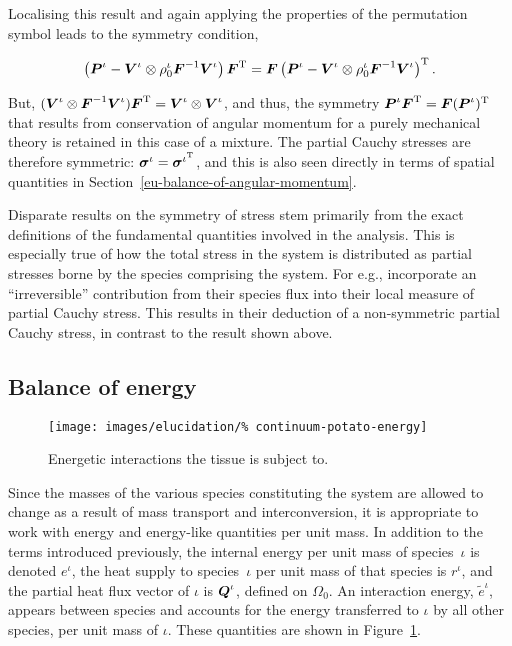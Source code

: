 \noindent Localising this result and again applying the properties of
the permutation symbol leads to the symmetry condition,

\begin{equation}
\left(\mbox{\boldmath$ P$}^\iota-\mbox{\boldmath$ V$}^\iota\otimes\rho^\iota_0\mbox{\boldmath$ F$}^{-1}\mbox{\boldmath$ V$}^\iota\right)
\mbox{\boldmath$ F$}^\mathrm{T} = \mbox{\boldmath$ F$}\left(\mbox{\boldmath$ P$}^\iota-\mbox{\boldmath$ V$}^\iota \otimes
\rho^\iota_0\mbox{\boldmath$ F$}^{-1}\mbox{\boldmath$ V$}^\iota\right)^\mathrm{T}.
\label{localbalanceofangularmomentum}
\end{equation}

\noindent But, $(\mbox{\boldmath$ V$}^\iota\otimes\mbox{\boldmath$ F$}^{-1}\mbox{\boldmath$ V$}^\iota)\mbox{\boldmath$ F$}^\mathrm{T} =
\mbox{\boldmath$ V$}^\iota\otimes\mbox{\boldmath$ V$}^\iota$, and thus, the symmetry
$\mbox{\boldmath$ P$}^\iota\mbox{\boldmath$ F$}^\mathrm{T} = \mbox{\boldmath$ F$}(\mbox{\boldmath$ P$}^\iota)^\mathrm{T}$ that results
from conservation of angular momentum for a purely mechanical theory
is retained in this case of a mixture. The partial Cauchy stresses are
therefore symmetric: $\mbox{\boldmath$\sigma$}^\iota = \mbox{\boldmath$\sigma$}^{\iota^\mathrm{T}}$, and
this is also seen directly in terms of spatial quantities in
Section~\ref{eu-balance-of-angular-momentum}.

Disparate results on the symmetry of stress stem primarily from the
exact definitions of the fundamental quantities involved in the
analysis. This is especially true of how the total stress in the
system is distributed as partial stresses borne by the species
comprising the system. For e.g., \citet{EpsteinMaugin:2000}
incorporate an ``irreversible'' contribution from their species flux
into their local measure of partial Cauchy stress. This results in
their deduction of a non-symmetric partial Cauchy stress, in contrast
to the result shown above.

\vspace{1cm} %

\subsection{Balance of energy}
\label{balance-of-energy}

\begin{figure}[ht]
  \centering
  \texttt{[image: images/elucidation/\%
    continuum-potato-energy]}
  \caption{Energetic interactions the tissue is subject to.}
  \label{continuum-potato-energy}
\end{figure}

Since the masses of the various species constituting the system are
allowed to change as a result of mass transport and interconversion,
it is appropriate to work with energy and energy-like quantities per
unit mass. In addition to the terms introduced previously, the
internal energy per unit mass of species~$\iota$ is denoted $e^\iota$,
the heat supply to species~$\iota$ per unit mass of that species is
$r^\iota$, and the partial heat flux vector of $\iota$ is $\mbox{\boldmath$ Q$}^\iota$,
defined on $\Omega_0$. An interaction energy, $\tilde{e}^\iota$,
appears between species and accounts for the energy transferred to
$\iota$ by all other species, per unit mass of $\iota$. These
quantities are shown in Figure~\ref{continuum-potato-energy}.


